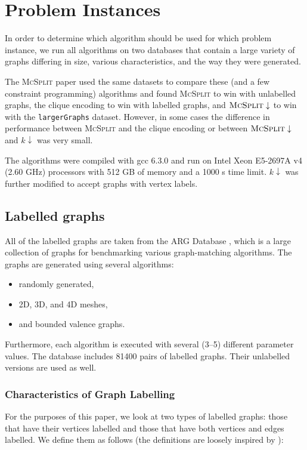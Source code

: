 \documentclass{article}
\theoremstyle{definition}
\theoremstyle{remark}
\begin{document}
\section{Problem Instances}
In order to determine which algorithm should be used for which problem instance,
we run all algorithms on two databases that contain a large variety of graphs
differing in size, various characteristics, and the way they were generated.

The \textsc{McSplit} paper \cite{DBLP:conf/ijcai/McCreeshPT17} used the same
datasets to compare these (and a few constraint programming) algorithms and
found \textsc{McSplit} to win with unlabelled graphs, the clique encoding to
win with labelled graphs, and $\textsc{McSplit}\downarrow$ to win with the
\texttt{largerGraphs} dataset. However, in some cases the difference in
performance between \textsc{McSplit} and the clique encoding or between
$\textsc{McSplit}\downarrow$ and $k\downarrow$ was very small.

The algorithms were compiled with gcc 6.3.0 and run on Intel Xeon E5-2697A v4
(2.60 GHz) processors with 512 GB of memory and a 1000 s time limit.
$k\downarrow$ was further modified to accept graphs with vertex labels.

\subsection{Labelled graphs}
All of the labelled graphs are taken from the ARG Database \cite{foggia2001-2,
  DBLP:journals/prl/SantoFSV03}, which is a large collection of graphs for
benchmarking various graph-matching algorithms. The graphs are generated using
several algorithms:

\begin{itemize}
\item randomly generated,
\item 2D, 3D, and 4D meshes,
\item and bounded valence graphs.
\end{itemize}

Furthermore, each algorithm is executed with several (3--5) different parameter
values. The database includes 81400 pairs of labelled graphs. Their unlabelled
versions are used as well.

\subsubsection{Characteristics of Graph Labelling}
For the purposes of this paper, we look at two types of labelled graphs: those
that have their vertices labelled and those that have both vertices and edges
labelled. We define them as follows (the definitions are loosely inspired by
\cite{abu-aisheh_2016}):
\end{document}
